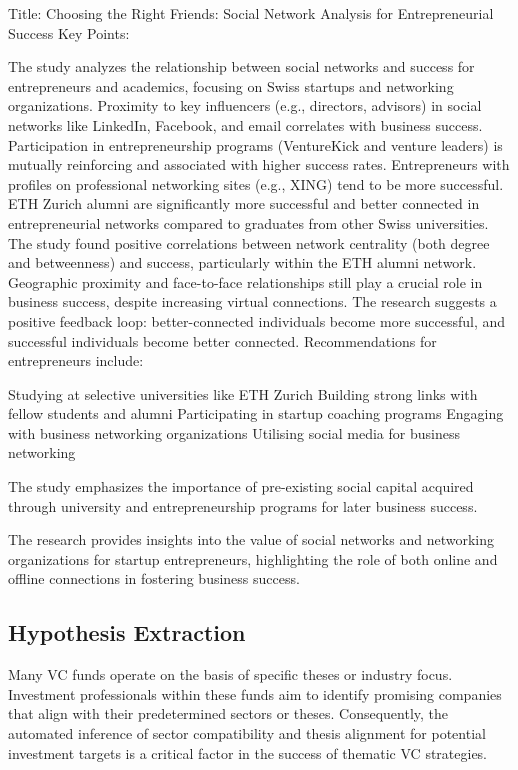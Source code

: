 \documentclass[a4paper, oneside]{discothesis}
\begin{document}
Title: Choosing the Right Friends: Social Network Analysis for Entrepreneurial Success
Key Points:

The study analyzes the relationship between social networks and success for entrepreneurs and academics, focusing on Swiss startups and networking organizations.
Proximity to key influencers (e.g., directors, advisors) in social networks like LinkedIn, Facebook, and email correlates with business success.
Participation in entrepreneurship programs (VentureKick and venture leaders) is mutually reinforcing and associated with higher success rates.
Entrepreneurs with profiles on professional networking sites (e.g., XING) tend to be more successful.
ETH Zurich alumni are significantly more successful and better connected in entrepreneurial networks compared to graduates from other Swiss universities.
The study found positive correlations between network centrality (both degree and betweenness) and success, particularly within the ETH alumni network.
Geographic proximity and face-to-face relationships still play a crucial role in business success, despite increasing virtual connections.
The research suggests a positive feedback loop: better-connected individuals become more successful, and successful individuals become better connected.
Recommendations for entrepreneurs include:

Studying at selective universities like ETH Zurich
Building strong links with fellow students and alumni
Participating in startup coaching programs
Engaging with business networking organizations
Utilising social media for business networking


The study emphasizes the importance of pre-existing social capital acquired through university and entrepreneurship programs for later business success.

The research provides insights into the value of social networks and networking organizations for startup entrepreneurs, highlighting the role of both online and offline connections in fostering business success.

\subsection{Hypothesis Extraction}

Many VC funds operate on the basis of specific theses or industry focus. Investment professionals within these funds aim to identify promising companies that align with their predetermined sectors or theses. Consequently, the automated inference of sector compatibility and thesis alignment for potential investment targets is a critical factor in the success of thematic VC strategies.
\end{document}
